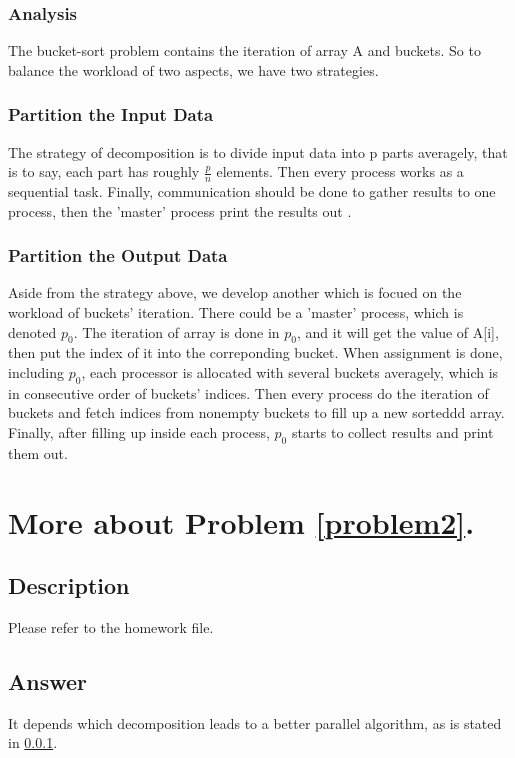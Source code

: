 \documentclass[a4paper]{article}   %
\begin{document}
\begin{CJK}{UTF8}{gbsn}
\begin{spacing}{1.2}
\subsubsection{Analysis} \label{analysis_problem2}
The bucket-sort problem contains the iteration of array A and buckets. So to balance the workload of two aspects, we have two strategies. 

\subsubsection{Partition the Input Data} \label{first_method_problem2}
The strategy of decomposition is to divide input data into p parts averagely, that is to say, each part has roughly $\frac{p}{n}$ elements. Then every process works as a sequential task. Finally, communication  should be done to gather results to one process, then the 'master' process print the results out . 

\subsubsection{Partition the Output Data} \label{second_method_problem2}
Aside from the strategy above, we develop another which is focued on the workload of buckets' iteration. There could be a 'master' process, which is denoted $p_0$. The iteration of array is done in $p_0$, and it will get the value of A[i], then put the index of it into the correponding bucket. When assignment is done, including $p_0$, each processor is allocated with several buckets averagely, which is in consecutive order of buckets' indices. Then every process do the iteration of buckets and fetch indices from nonempty buckets to fill up a new sorteddd array. Finally, after filling up inside each process, $p_0$ starts to collect results and print them out. 

\section{More about Problem \ref{problem2}.}
\subsection{Description}
Please refer to the homework file. 
\subsection{Answer}
It depends which decomposition leads to a better parallel algorithm, as is stated in \ref{analysis_problem2}. 

\end{spacing}
\end{CJK}
\end{document}
